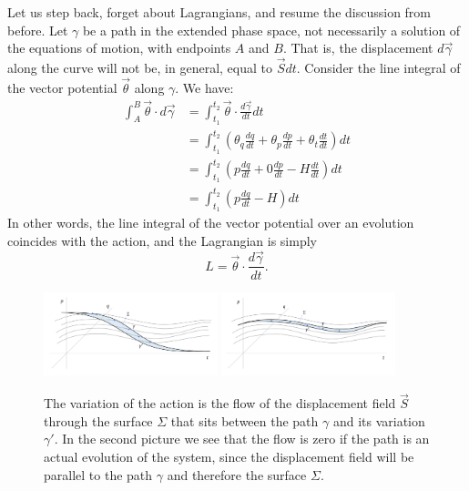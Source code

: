 \documentclass[10pt,twocolumn, nofootinbib]{revtex4-2}
\begin{document}
Let us step back, forget about Lagrangians, and resume the discussion from before. Let $\gamma$ be a path in the extended phase space, not necessarily a solution of the equations of motion, with endpoints $A$ and $B$. That is, the displacement $d\vec{\gamma}$ along the curve will not be, in general, equal to $\vec{S}dt$. Consider the line integral of the vector potential $\vec{\theta}$ along $\gamma$. We have:
\begin{equation}
\begin{aligned}
	\int_A^B \vec{\theta} \cdot d\vec{\gamma} &= \int^{t_2}_{t_1} \vec{\theta} \cdot \frac{d\vec{\gamma}}{dt} dt \\
	&= \int^{t_2}_{t_1} \left(\theta_q \frac{dq}{dt} + \theta_p \frac{dp}{dt} + \theta_t \frac{dt}{dt}\right) dt \\
	&= \int^{t_2}_{t_1} \left(p \frac{dq}{dt} + 0 \frac{dp}{dt} - H \frac{dt}{dt}\right) dt \\
	&= \int^{t_2}_{t_1} \left(p \frac{dq}{dt} - H\right) dt
\end{aligned}
\end{equation}
In other words, the line integral of the vector potential over an evolution coincides with the action, and the Lagrangian is simply
\begin{equation}
	L = \vec{\theta} \cdot \frac{d\vec{\gamma}}{dt}.
\end{equation}

\begin{figure}
	\includegraphics[width = 0.45\textwidth]{ActionNonOptimized.png}
	\includegraphics[width = 0.45\textwidth]{ActionOptimized.png}
	\caption{\footnotesize{The variation of the action is the flow of the displacement field $\vec{S}$ through the surface $\Sigma$ that sits between the path $\gamma$ and its variation $\gamma'$. In the second picture we see that the flow is zero if the path is an actual evolution of the system, since the displacement field will be parallel to the path $\gamma$ and therefore the surface $\Sigma$.}}\label{action}
\end{figure}
\end{document}

